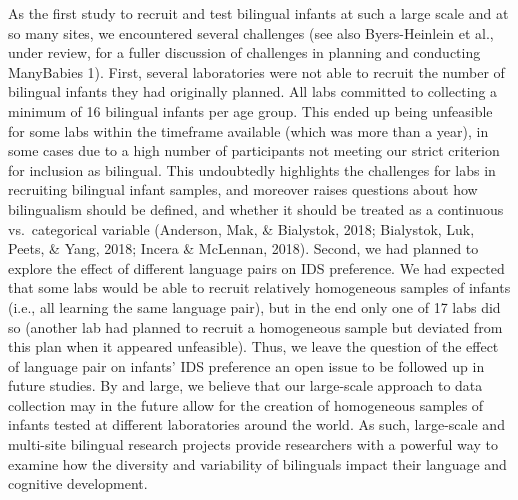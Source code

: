 \documentclass[,man,floatsintext]{apa6}
\begin{document}
As the first study to recruit and test bilingual infants at such a large scale and at so many sites, we encountered several challenges (see also Byers-Heinlein et al., under review, for a fuller discussion of challenges in planning and conducting ManyBabies 1). First, several laboratories were not able to recruit the number of bilingual infants they had originally planned. All labs committed to collecting a minimum of 16 bilingual infants per age group. This ended up being unfeasible for some labs within the timeframe available (which was more than a year), in some cases due to a high number of participants not meeting our strict criterion for inclusion as bilingual. This undoubtedly highlights the challenges for labs in recruiting bilingual infant samples, and moreover raises questions about how bilingualism should be defined, and whether it should be treated as a continuous vs.~categorical variable (Anderson, Mak, \& Bialystok, 2018; Bialystok, Luk, Peets, \& Yang, 2018; Incera \& McLennan, 2018). Second, we had planned to explore the effect of different language pairs on IDS preference. We had expected that some labs would be able to recruit relatively homogeneous samples of infants (i.e., all learning the same language pair), but in the end only one of 17 labs did so (another lab had planned to recruit a homogeneous sample but deviated from this plan when it appeared unfeasible). Thus, we leave the question of the effect of language pair on infants' IDS preference an open issue to be followed up in future studies. By and large, we believe that our large-scale approach to data collection may in the future allow for the creation of homogeneous samples of infants tested at different laboratories around the world. As such, large-scale and multi-site bilingual research projects provide researchers with a powerful way to examine how the diversity and variability of bilinguals impact their language and cognitive development.
\end{document}
